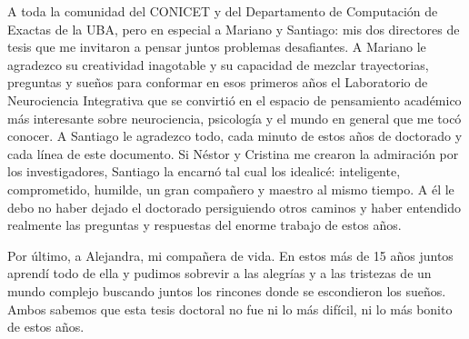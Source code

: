 A toda la comunidad del CONICET y del Departamento de Computación de Exactas de la UBA, pero en especial a Mariano y Santiago: mis dos directores de tesis que me invitaron a pensar juntos problemas desafiantes. A Mariano le agradezco su creatividad inagotable y su capacidad de mezclar trayectorias, preguntas y sueños para conformar en esos primeros años el Laboratorio de Neurociencia Integrativa que se convirtió en el espacio de pensamiento académico más interesante sobre neurociencia, psicología y el mundo en general que me tocó conocer. A Santiago le agradezco todo, cada minuto de estos años de doctorado y cada línea de este documento. Si Néstor y Cristina me crearon la admiración por los investigadores, Santiago la encarnó tal cual los idealicé: inteligente, comprometido, humilde, un gran compañero y maestro al mismo tiempo. A él le debo no haber dejado el doctorado persiguiendo otros caminos y haber entendido realmente las preguntas y respuestas del enorme trabajo de estos años.

Por último, a Alejandra, mi compañera de vida. En estos más de 15 años juntos aprendí todo de ella y pudimos sobrevir a las alegrías y a las tristezas de un mundo complejo buscando juntos los rincones donde se escondieron los sueños. Ambos sabemos que esta tesis doctoral no fue ni lo más difícil, ni lo más bonito de estos años.